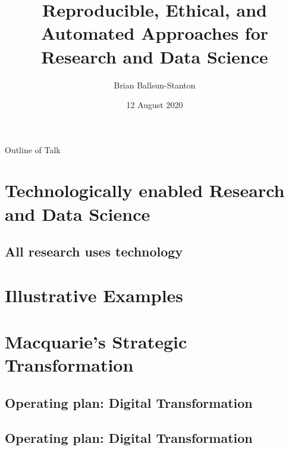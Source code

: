 \documentclass[aspectratio=1610, 11pt]{beamer} %
\title{Reproducible, Ethical, and Automated Approaches for Research and Data Science} %
\author{Brian Ballsun-Stanton}               %
\institute{Faculty of Arts}         %
\date{12 August 2020}                 %
\begin{document}
\maketitle


\begin{frame}{Outline of Talk}
  \tableofcontents
\end{frame}



\section{Technologically enabled Research and Data Science}

\subsection{All research uses technology}

\section{Illustrative Examples}

\section{Macquarie's Strategic Transformation}

\subsection{Operating plan: Digital Transformation}
\begin{frame}{}
\end{frame}

\subsection{Operating plan: Digital Transformation}
\end{document}
